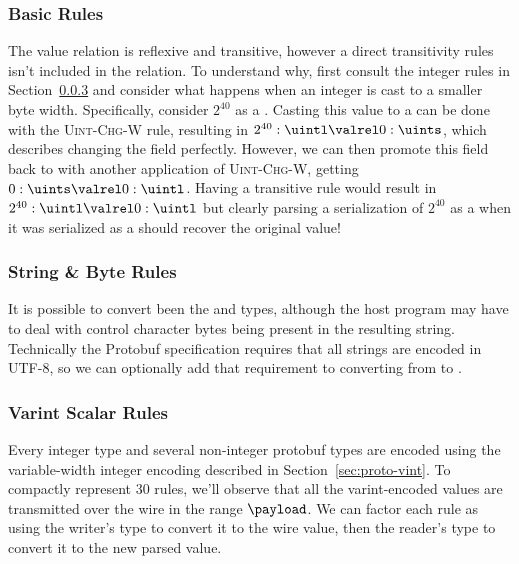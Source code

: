 \subsubsection{Basic Rules}

The value relation is reflexive and transitive, however a direct transitivity
rules isn't included in the relation. To understand why, first consult the
integer rules in Section~\ref{sec:proto-compat-ints} and consider what happens
when an integer is cast to a smaller byte width. Specifically, consider $2^{40}$
as a \uintl. Casting this value to a \uints{} can be done with
the \textsc{Uint-Chg-W} rule, resulting in
$2^{40} : \uintl \valrel 0 : \uints$, which describes changing
the field perfectly. However, we can then promote this field back to
\uintl{} with another application of \textsc{Uint-Chg-W}, getting
$0 : \uints \valrel 0 : \uintl$. Having a transitive rule
would result in $2^{40} : \uintl \valrel 0 : \uintl$ but
clearly parsing a serialization of $2^{40}$ as a \uintl{} when it was
serialized as a \uintl{} should recover the original value!

\begin{mathpar}
\end{mathpar}

\subsubsection{String \& Byte Rules}

It is possible to convert been the \String{} and \byt{} types,
although the host program may have to deal with control character bytes being
present in the resulting string. Technically the Protobuf specification requires
that all strings are encoded in UTF-8, so we can optionally add that requirement
to converting from \byt{} to \String.

\begin{mathpar}

\end{mathpar}

\subsubsection{Varint Scalar Rules}\label{sec:proto-compat-ints}

Every integer type and several non-integer protobuf types are encoded using the
variable-width integer encoding described in Section~\ref{sec:proto-vint}. To
compactly represent 30 rules, we'll observe that all the varint-encoded values
are transmitted over the wire in the range $\payload$. We can factor each
rule as using the writer's type to convert it to the wire value, then the
reader's type to convert it to the new parsed value.

